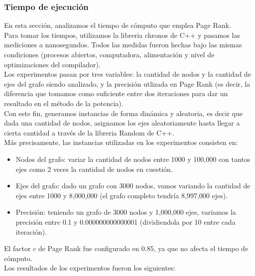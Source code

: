\subsubsection{Tiempo de ejecución}

En esta sección, analizamos el tiempo de cómputo que emplea Page Rank.\\
Para tomar los tiempos, utilizamos la libreria chronos de C++ y pasamos las mediciones a nanosegundos. Todos las medidas fueron hechas bajo las mismas condiciones (procesos abiertos, computadora, alimentación y nivel de optimizaciones del compilador).\\
Los experimentos pasan por tres variables: la cantidad de nodos y la cantidad de ejes del grafo siendo analizado, y la precisión utlizada en Page Rank (es decir, la diferencia que tomamos como suficiente entre dos iteraciones para dar un resultado en el método de la potencia).\\
Con este fin, generamos instancias de forma dinámica y aleatoria, es decir que dada una cantidad de nodos, asignamos los ejes aleatoriamente hasta llegar a cierta cantidad a través de la libreria Random de C++.\\
Más precisamente, las instancias utilizadas en los experimentos consisten en:
\begin{itemize}
    \item Nodos del grafo: variar la cantidad de nodos entre 1000 y 100,000 con tantos ejes como 2 veces la cantidad de nodos en cuestión.
    \item Ejes del grafo: dado un grafo con 3000 nodos, vamos variando la cantidad de ejes entre 1000 y 8,000,000 (el grafo completo tendría 8,997,000 ejes).
    \item Precisión: teniendo un grafo de 3000 nodos y 1,000,000 ejes, variamos la precisión entre 0.1 y 0.000000000000001 (dividiendola por 10 entre cada iteración).
\end{itemize}
El factor $c$ de Page Rank fue configurado en 0.85, ya que no afecta el tiempo de cómputo.\\

Los resultados de los experimentos fueron los siguientes:

\begin{center}
\end{center}

